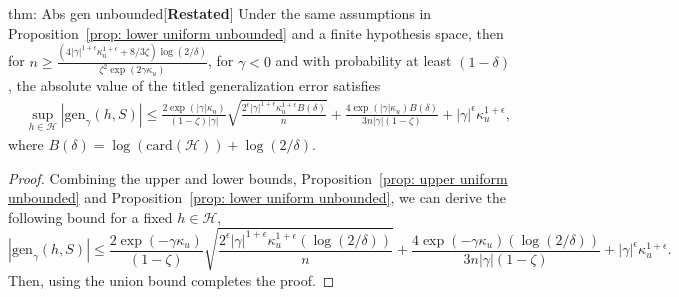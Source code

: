 \documentclass{article}
\theoremstyle{plain}
\theoremstyle{plain}
\theoremstyle{definition}
\theoremstyle{remark}
\begin{document}
{\begin{tcolorbox}
\begin{reptheorem}{thm: Abs gen unbounded}[\textbf{Restated}]
   Under the same assumptions in Proposition~\ref{prop: lower uniform unbounded} and a finite hypothesis space, then for $n\geq \frac{(4|\gamma|^{1+\epsilon}\kappa_u^{1+\epsilon}+8/3 \zeta )\log(2/\delta)}{\zeta^2\exp(2\gamma \kappa_u)}$, for $\gamma<0$ and with probability at least $(1-\delta)$, the absolute value of the titled generalization error satisfies 
    \begin{align}
&\sup_{h\in\mathcal{H}}|\mathrm{gen}_{\gamma}(h,S)|\leq \frac{2\exp(|\gamma| \kappa_u)}{(1-\zeta)|\gamma|}\sqrt{\frac{2^{\epsilon}|\gamma|^{1+\epsilon}\kappa_u^{1+\epsilon}B(\delta)}{n}} +\frac{4\exp(|\gamma| \kappa_u)B(\delta)}{3n|\gamma|(1-\zeta)} +|\gamma|^{\epsilon}\kappa_u^{1+\epsilon},
             \end{align}
              where $B(\delta)= \log(\mathrm{card}(\mathcal{H}))+\log(2/\delta)$.
\end{reptheorem}
\end{tcolorbox}
\begin{proof}
    Combining the upper and lower bounds, Proposition~\ref{prop: upper uniform unbounded} and Proposition~\ref{prop: lower uniform unbounded}, we can derive the following bound for a fixed $h\in\mathcal{H}$,  
    \begin{equation} 
        |\mathrm{gen}_{\gamma}(h,S)|\leq \frac{2\exp(-\gamma \kappa_u)}{(1-\zeta)}\sqrt{\frac{2^{\epsilon}|\gamma|^{1+\epsilon}\kappa_u^{1+\epsilon}(\log(2/\delta))}{n}} %
        +\frac{4\exp(-\gamma \kappa_u)(\log(2/\delta))}{3n|\gamma|(1-\zeta)}+|\gamma|^{\epsilon}\kappa_u^{1+\epsilon}. 
     \end{equation}
     Then, using the union bound completes the proof.
\end{proof}
}
\end{document}
